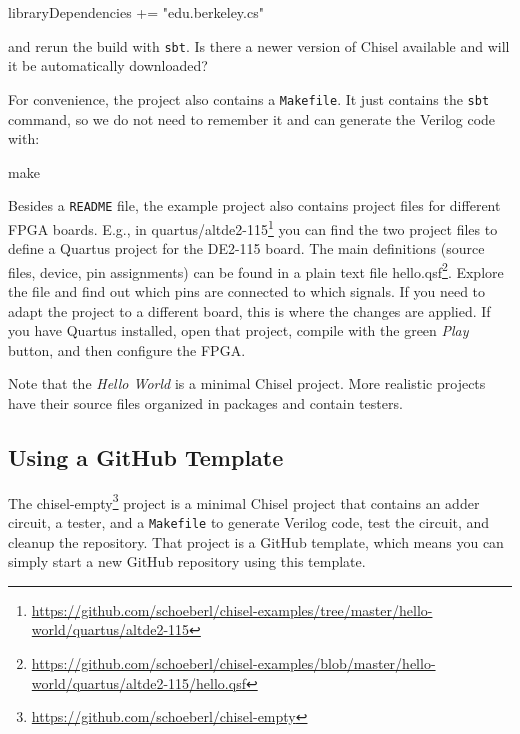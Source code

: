 \documentclass[%
    10pt,
    headinclude, footexclude,
    openright, %
    notitlepage,
    cleardoubleempty,
    headsepline,
    pointlessnumbers,
    bibtotoc, idxtotoc,
    ]{scrbook}
\newcommand{\code}[1]{{\small{\texttt{#1}}}}
\newcommand{\myref}[2]{\href{#1}{#2}}
\renewcommand{\myref}[2]{{#2}{\footnote{\url{#1}}}}
\begin{document}
\begin{chisel}
libraryDependencies += "edu.berkeley.cs" %
\end{chisel}

\noindent and rerun the build with \code{sbt}. Is there a newer version of Chisel
available and will it be automatically downloaded?

For convenience, the project also contains a \code{Makefile}.
It just contains the \code{sbt} command, so we do not need to remember it and
can generate the Verilog code with:

\begin{chisel}
make
\end{chisel}

Besides a \code{README} file, the example project also contains project
files for different FPGA boards. E.g., in
\myref{https://github.com/schoeberl/chisel-examples/tree/master/hello-world/quartus/altde2-115}{quartus/altde2-115}
you can find the two project files to define a Quartus project for the DE2-115 board.
The main definitions (source files, device, pin assignments) can be found in a plain text file
\myref{https://github.com/schoeberl/chisel-examples/blob/master/hello-world/quartus/altde2-115/hello.qsf}{hello.qsf}.
Explore the file and find out which pins are connected to which signals.
If you need to adapt the project to a different board, this is where the changes are applied.
If you have Quartus installed, open that project, compile with the green \emph{Play} button,
and then configure the FPGA.

Note that the \emph{Hello World} is a minimal Chisel project.
More realistic projects have their source files organized in packages and contain testers.

\subsection{Using a GitHub Template}

The \myref{https://github.com/schoeberl/chisel-empty}{chisel-empty} project is a minimal Chisel
project that contains an adder circuit, a tester, and a \code{Makefile} to generate
Verilog code, test the circuit, and cleanup the repository.
That project is a GitHub template, which means you can simply start a new GitHub repository
using this template.
\end{document}
